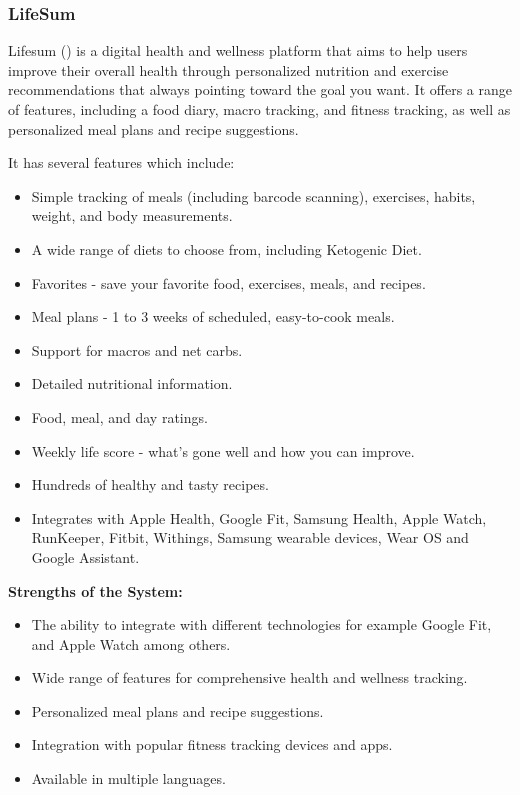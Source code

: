 \documentclass{article}
\begin{document}
\subsubsection{LifeSum}

Lifesum (\cite{lifesum}) is a digital health and wellness platform that aims to help users improve their overall health through personalized nutrition and exercise recommendations that always pointing toward the goal you want. It offers a range of features, including a food diary, macro tracking, and fitness tracking, as well as personalized meal plans and recipe suggestions.

It has several features which include:
\begin{itemize}
\item Simple tracking of meals (including barcode scanning), exercises, habits, weight, and body measurements.
\item A wide range of diets to choose from, including Ketogenic Diet.
\item Favorites - save your favorite food, exercises, meals, and recipes.
\item Meal plans - 1 to 3 weeks of  scheduled, easy-to-cook meals.
\item Support for macros and net carbs.
\item Detailed nutritional information.
\item Food, meal, and day ratings.
\item Weekly life score - what's gone well and how you can improve.
\item Hundreds of healthy and tasty recipes.
\item Integrates with Apple Health, Google Fit, Samsung Health, Apple Watch, RunKeeper, Fitbit, Withings, Samsung wearable devices, Wear OS and Google Assistant.
\end{itemize}

\textbf{Strengths of the System:}
\begin{itemize}
\item The ability to integrate with different technologies for example Google Fit, and Apple Watch among others.
\item Wide range of features for comprehensive health and wellness tracking.
\item Personalized meal plans and recipe suggestions.
\item Integration with popular fitness tracking devices and apps.
\item Available in multiple languages.
\end{itemize}
\end{document}
